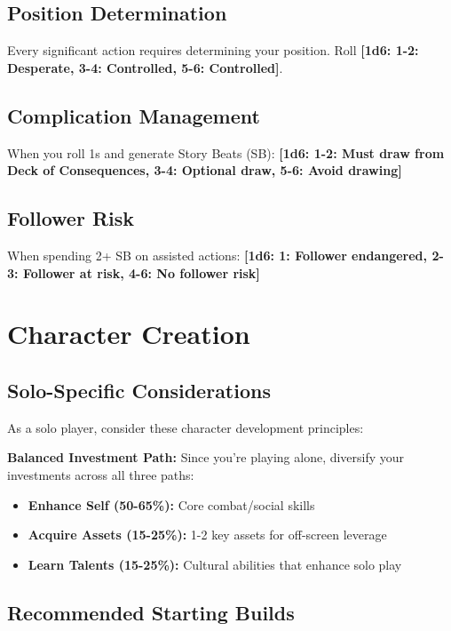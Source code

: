 \documentclass[11pt]{article}
\newcommand{\dice}[1]{\textbf{[1d6: #1]}}
\begin{document}
\subsection{Position Determination}

Every significant action requires determining your position. Roll \dice{1-2: Desperate, 3-4: Controlled, 5-6: Controlled}.

\subsection{Complication Management}

When you roll 1s and generate Story Beats (SB):
\dice{1-2: Must draw from Deck of Consequences, 3-4: Optional draw, 5-6: Avoid drawing}

\subsection{Follower Risk}

When spending 2+ SB on assisted actions:
\dice{1: Follower endangered, 2-3: Follower at risk, 4-6: No follower risk}

\section{Character Creation}

\subsection{Solo-Specific Considerations}

As a solo player, consider these character development principles:

\begin{framed}
\textbf{Balanced Investment Path:} Since you're playing alone, diversify your investments across all three paths:
\begin{itemize}
    \item \textbf{Enhance Self (50-65\%):} Core combat/social skills
    \item \textbf{Acquire Assets (15-25\%):} 1-2 key assets for off-screen leverage
    \item \textbf{Learn Talents (15-25\%):} Cultural abilities that enhance solo play
\end{itemize}
\end{framed}

\subsection{Recommended Starting Builds}
\end{document}
